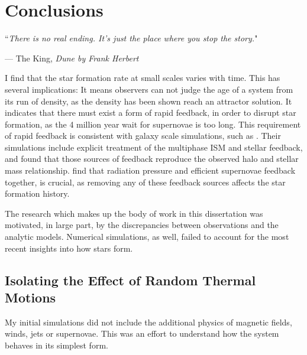 \documentclass[../dissertation.tex]{subfiles}
\begin{document}
\chapter{Conclusions}
\label{ch:conclusions}

\singlespace
\epigraph{``\emph{There is no real ending. It's just the place where you stop the story.}"}{--- \textup{The King}, \textit{Dune by Frank Herbert}}

\dblspace

I find that the star formation rate at small scales varies with time.
This has several implications: It means observers can not judge the age of a system from its run of density,
as the density has been shown reach an attractor solution.
It indicates that there must exist a form of rapid feedback, in order to disrupt star formation, as the 4 million year wait for supernovae is too long.
This requirement of rapid feedback is consistent with galaxy scale simulations, such as \citet{2014MNRAS.445..581H}. 
Their simulations include explicit treatment of the multiphase ISM and stellar feedback, and
\citet{2014MNRAS.445..581H} found that those sources of feedback reproduce the observed halo and stellar mass relationship.
\citet{2015ApJ...804...18A} find that radiation pressure and efficient supernovae feedback together, is crucial, as removing any of these feedback sources affects
the star formation history.

The research which makes up the body of work in this dissertation was motivated, in large part, 
by the discrepancies between observations and the analytic models. 
Numerical simulations, as well, failed to account for the most recent insights into how stars form. 

\section{Isolating the Effect of Random Thermal Motions}
My initial simulations did not include the additional physics of magnetic fields, winds, jets or supernovae. 
This was an effort to understand how the system behaves in its simplest form.
\end{document}
